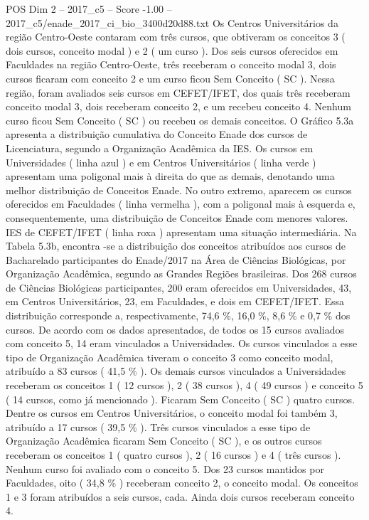 \begin{textsample}{POS Dim 2 – 2017\_c5 – Score -1.00 – 2017\_c5/enade\_2017\_ci\_bio\_3400d20d88.txt}
Os Centros Universitários da região Centro-Oeste contaram com três cursos, que obtiveram os conceitos 3 ( dois cursos, conceito modal ) e 2 ( um curso ).
Dos seis cursos oferecidos em Faculdades na região Centro-Oeste, três receberam o conceito modal 3, dois cursos ficaram com conceito 2 e um curso ficou Sem Conceito ( SC ).
Nessa região, foram avaliados seis cursos em CEFET/IFET, dos quais três receberam conceito modal 3, dois receberam conceito 2, e um recebeu conceito 4.
Nenhum curso ficou Sem Conceito ( SC ) ou recebeu os demais conceitos.
O Gráfico 5.3a apresenta a distribuição cumulativa do Conceito Enade dos cursos de Licenciatura, segundo a Organização Acadêmica da IES.
Os cursos em Universidades ( linha azul ) e em Centros Universitários ( linha verde ) apresentam uma poligonal mais à direita do que as demais, denotando uma melhor distribuição de Conceitos Enade.
No outro extremo, aparecem os cursos oferecidos em Faculdades ( linha vermelha ), com a poligonal mais à esquerda e, consequentemente, uma distribuição de Conceitos Enade com menores valores.
IES de CEFET/IFET ( linha roxa ) apresentam uma situação intermediária.
Na Tabela 5.3b, encontra -se a distribuição dos conceitos atribuídos aos cursos de Bacharelado participantes do Enade/2017 na Área de Ciências Biológicas, por Organização Acadêmica, segundo as Grandes Regiões brasileiras.
Dos 268 cursos de Ciências Biológicas participantes, 200 eram oferecidos em Universidades, 43, em Centros Universitários, 23, em Faculdades, e dois em CEFET/IFET.
Essa distribuição corresponde a, respectivamente, 74,6 \%, 16,0 \%, 8,6 \% e 0,7 \% dos cursos.
De acordo com os dados apresentados, de todos os 15 cursos avaliados com conceito 5, 14 eram vinculados a Universidades.
Os cursos vinculados a esse tipo de Organização Acadêmica tiveram o conceito 3 como conceito modal, atribuído a 83 cursos ( 41,5 \% ).
Os demais cursos vinculados a Universidades receberam os conceitos 1 ( 12 cursos ), 2 ( 38 cursos ), 4 ( 49 cursos ) e conceito 5 ( 14 cursos, como já mencionado ).
Ficaram Sem Conceito ( SC ) quatro cursos.
Dentre os cursos em Centros Universitários, o conceito modal foi também 3, atribuído a 17 cursos ( 39,5 \% ).
Três cursos vinculados a esse tipo de Organização Acadêmica ficaram Sem Conceito ( SC ), e os outros cursos receberam os conceitos 1 ( quatro cursos ), 2 ( 16 cursos ) e 4 ( três cursos ).
Nenhum curso foi avaliado com o conceito 5.
Dos 23 cursos mantidos por Faculdades, oito ( 34,8 \% ) receberam conceito 2, o conceito modal.
Os conceitos 1 e 3 foram atribuídos a seis cursos, cada.
Ainda dois cursos receberam conceito 4.

\end{textsample}

